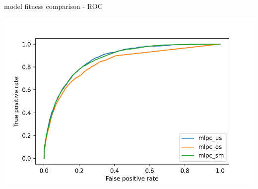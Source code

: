 \documentclass{beamer}
\begin{document}
\begin{frame}{model fitness comparison - ROC}

\begin{center}
\includegraphics[scale=0.65]{img/mlpc_roc.png}
\end{center}
\end{frame}
\end{document}
